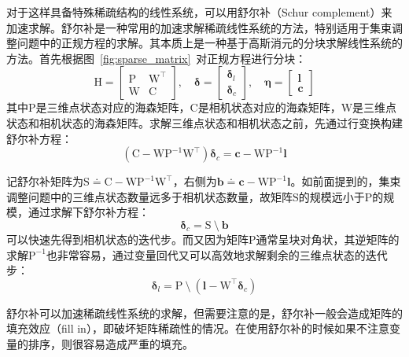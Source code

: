 对于这样具备特殊稀疏结构的线性系统，可以用舒尔补（Schur complement）来加速求解。舒尔补是一种常用的加速求解稀疏线性系统的方法，特别适用于集束调整问题中的正规方程的求解。其本质上是一种基于高斯消元的分块求解线性系统的方法。首先根据图~\ref{fig:sparse_matrix}~对正规方程进行分块：
\begin{equation}
    \mathrm{H} =
    \begin{bmatrix}
        \mathrm{P} & \mathrm{W}^\top \\
        \mathrm{W} & \mathrm{C}
    \end{bmatrix}, \quad
    \bm{\delta} = \begin{bmatrix} \bm{\delta}_l \\ \bm{\delta}_c \end{bmatrix}, \quad
    \bm{\eta} = \begin{bmatrix} \bm{l} \\ \bm{c} \end{bmatrix}
\end{equation}
其中$\mathrm{P}$是三维点状态对应的海森矩阵，$\mathrm{C}$是相机状态对应的海森矩阵，$\mathrm{W}$是三维点状态和相机状态的海森矩阵。求解三维点状态和相机状态之前，先通过行变换构建舒尔补方程：
\begin{equation}
    \left( \mathrm{C}-\mathrm{W}\mathrm{P}^{-1}\mathrm{W}^\top \right)
    \bm{\delta}_c = \bm{c}-\mathrm{W}\mathrm{P}^{-1}\bm{l}
    \label{eq:schur_complement}
\end{equation}

记舒尔补矩阵为$\mathrm{S}\doteq\mathrm{C}-\mathrm{W}\mathrm{P}^{-1}\mathrm{W}^\top$，右侧为$\bm{b}\doteq\bm{c}-\mathrm{W}\mathrm{P}^{-1}\bm{l}$。如前面提到的，集束调整问题中的三维点状态数量远多于相机状态数量，故矩阵$\mathrm{S}$的规模远小于$\mathrm{P}$的规模，通过求解下舒尔补方程：
\begin{equation}
    \bm{\delta}_c = \mathrm{S} \:\setminus\: \bm{b}
    \label{eq:solve_schur}
\end{equation}
可以快速先得到相机状态的迭代步。而又因为矩阵$\mathrm{P}$通常呈块对角状，其逆矩阵的求解$\mathrm{P}^{-1}$也非常容易，通过变量回代又可以高效地求解剩余的三维点状态的迭代步：
\begin{equation}
    \bm{\delta}_l = \mathrm{P}
    \:\setminus\:
    \left( \bm{l}-\mathrm{W}^\top\bm{\delta}_c \right)
    \label{eq:back_sub}
\end{equation}

舒尔补可以加速稀疏线性系统的求解，但需要注意的是，舒尔补一般会造成矩阵的填充效应（fill in）\citep{kaess2008isam}，即破坏矩阵稀疏性的情况。在使用舒尔补的时候如果不注意变量的排序，则很容易造成严重的填充。

